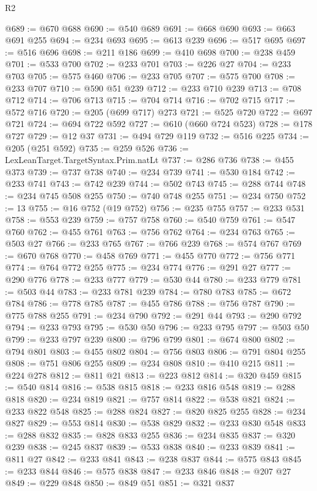 \begin{lexlean}{R2}
\begin{coremodule}
@689 := @670 @688
@690 := @540 @689
@691 := @668 @690
@693 := @663 @691 @255
@694 := @234 @693
@695 := @613 @239
@696 := @517 @695
@697 := @516 @696
@698 := @211 @186
@699 := @410 @698
@700 := @238 @459
@701 := @533 @700
@702 := @233 @701
@703 := @226 @27
@704 := @233 @703
@705 := @575 @460
@706 := @233 @705
@707 := @575 @700
@708 := @233 @707
@710 := @590 @51 @239
@712 := @233 @710 @239
@713 := @708 @712
@714 := @706 @713
@715 := @704 @714
@716 := @702 @715
@717 := @572 @716
@720 := @205 (@699 @717) @273
@721 := @525 @720
@722 := @697 @721
@724 := @694 @722 @592
@727 := @610 (@660 @724 @523)
@728 := @178 @727
@729 := @12 @37
@731 := @494 @729 @119
@732 := @516 @225
@734 := @205 (@251 @592)
@735 := @259 @526
@736 := LexLeanTarget.TargetSyntax.Prim.natLt
@737 := @286 @736
@738 := @455 @373
@739 := @737 @738
@740 := @234 @739
@741 := @530 @184
@742 := @233 @741
@743 := @742 @239
@744 := @502 @743
@745 := @288 @744
@748 := @234 @745 @508 @255
@750 := @740 @748 @255
@751 := @234 @750
@752 := 13
@755 := @16 @752 (@19 @752)
@756 := @235 @755
@757 := @233 @531
@758 := @553 @239
@759 := @757 @758
@760 := @540 @759
@761 := @547 @760
@762 := @455 @761
@763 := @756 @762
@764 := @234 @763
@765 := @503 @27
@766 := @233 @765
@767 := @766 @239
@768 := @574 @767
@769 := @670 @768
@770 := @458 @769
@771 := @455 @770
@772 := @756 @771
@774 := @764 @772 @255
@775 := @234 @774
@776 := @291 @27
@777 := @290 @776
@778 := @233 @777
@779 := @530 @44
@780 := @233 @779
@781 := @503 @44
@783 := @233 @781 @239
@784 := @780 @783
@785 := @672 @784
@786 := @778 @785
@787 := @455 @786
@788 := @756 @787
@790 := @775 @788 @255
@791 := @234 @790
@792 := @291 @44
@793 := @290 @792
@794 := @233 @793
@795 := @530 @50
@796 := @233 @795
@797 := @503 @50
@799 := @233 @797 @239
@800 := @796 @799
@801 := @674 @800
@802 := @794 @801
@803 := @455 @802
@804 := @756 @803
@806 := @791 @804 @255
@808 := @751 @806 @255
@809 := @234 @808
@810 := @410 @215
@811 := @224 @278
@812 := @811 @21
@813 := @223 @812
@814 := @320 @459
@815 := @540 @814
@816 := @538 @815
@818 := @233 @816 @548
@819 := @288 @818
@820 := @234 @819
@821 := @757 @814
@822 := @538 @821
@824 := @233 @822 @548
@825 := @288 @824
@827 := @820 @825 @255
@828 := @234 @827
@829 := @553 @814
@830 := @538 @829
@832 := @233 @830 @548
@833 := @288 @832
@835 := @828 @833 @255
@836 := @234 @835
@837 := @320 @239
@838 := @245 @837
@839 := @533 @838
@840 := @233 @839
@841 := @811 @27
@842 := @233 @841
@843 := @238 @837
@844 := @575 @843
@845 := @233 @844
@846 := @575 @838
@847 := @233 @846
@848 := @207 @27
@849 := @229 @848
@850 := @849 @51
@851 := @321 @837

\end{coremodule}
\end{lexlean}
